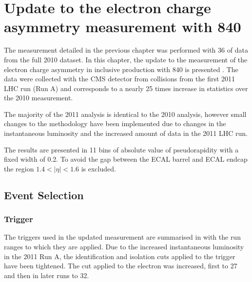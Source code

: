 \chapter[Update to the Electron Charge Asymmetry]{Update to the electron charge asymmetry
measurement with \unit{840}{\invpb} }
\label{chap:update}

The measurement detailed in the previous chapter was performed with
\unit{36}{\invpb} of data from the full 2010 dataset. 
In this chapter, the update to the measurement of the electron charge asymmetry in
inclusive \inclusiveWe production with \unit{840}{\invpb} is presented
\cite{asym840,bendavid2011electron}.
The data were collected with the {CMS} detector from collisions from the
first 2011 {LHC} run (Run A) and corresponds to a nearly 25 times increase in
statistics over the 2010 measurement.

The majority of the 2011 analysis is identical to the 2010 analysis,
however small changes to the methodology have been implemented due to changes
in the instantaneous luminosity and the increased amount of data in the 2011 {LHC} run.

The results are presented in 11 bins of absolute value of pseudorapidity with a
fixed width of 0.2. To avoid the gap between the ECAL barrel and ECAL endcap the
region $1.4<|\eta|<1.6$ is excluded.

\section{Event Selection}

\subsection{Trigger}
\label{sec:trigger2}

The triggers used in the updated measurement are summarised in
 with the run ranges to which they are applied.
Due to the increased instantaneous luminosity in the 2011 Run A, the
identification and isolation cuts applied to the trigger have been tightened.
The \PT cut applied to the electron was increased, first to
\unit{27}{\GeV} and then in later runs to \unit{32}{\GeV}. 


